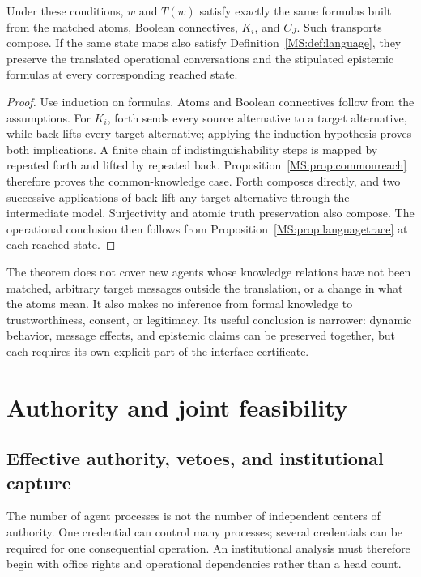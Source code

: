 \begin{MSproposition}\label{MS:prop:epistemictransport}
Under these conditions, $w$ and $T(w)$ satisfy exactly the same formulas built from the matched atoms, Boolean connectives, $K_i$, and $C_J$. Such transports compose. If the same state maps also satisfy Definition~\ref{MS:def:language}, they preserve the translated operational conversations and the stipulated epistemic formulas at every corresponding reached state.
\end{MSproposition}
\begin{proof}
Use induction on formulas. Atoms and Boolean connectives follow from the assumptions. For $K_i$, forth sends every source alternative to a target alternative, while back lifts every target alternative; applying the induction hypothesis proves both implications. A finite chain of indistinguishability steps is mapped by repeated forth and lifted by repeated back. Proposition~\ref{MS:prop:commonreach} therefore proves the common-knowledge case. Forth composes directly, and two successive applications of back lift any target alternative through the intermediate model. Surjectivity and atomic truth preservation also compose. The operational conclusion then follows from Proposition~\ref{MS:prop:languagetrace} at each reached state.
\end{proof}

The theorem does not cover new agents whose knowledge relations have not been matched, arbitrary target messages outside the translation, or a change in what the atoms mean. It also makes no inference from formal knowledge to trustworthiness, consent, or legitimacy. Its useful conclusion is narrower: dynamic behavior, message effects, and epistemic claims can be preserved together, but each requires its own explicit part of the interface certificate.


\chapter{Authority and joint feasibility}\label{MS:book:chapter-96}

\section{Effective authority, vetoes, and institutional capture}\label{MS:sec:power}
The number of agent processes is not the number of independent centers of authority. One credential can control many processes; several credentials can be required for one consequential operation. An institutional analysis must therefore begin with office rights and operational dependencies rather than a head count.

